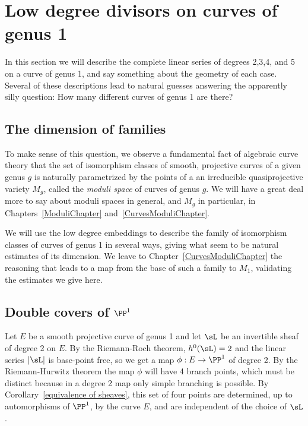 \section{Low degree divisors on curves of genus 1} 

In this section we will describe the complete linear series of degrees 2,3,4, and 5 on a curve of genus 1, and say something
about the geometry of each case. Several of these descriptions lead to natural guesses answering the
apparently silly question: How many different curves of genus 1 are there? 

\subsection {The dimension of families}

To make sense of this question, we observe a fundamental fact of algebraic curve theory that the set of isomorphism classes of smooth, projective curves of a given genus $g$ is naturally parametrized by the points of a
an irreducible quasiprojective variety $M_g$, called the \emph{moduli space} of curves of genus $g$. We will have a great deal more to say about moduli spaces in general, and $M_g$ in particular, in Chapters~\ref{ModuliChapter} and~\ref{CurvesModuliChapter}. 

We will use the low degree embeddings  to describe the family of isomorphism classes of curves of genus 1 in several ways, giving
what seem to be natural estimates of its dimension. We leave to Chapter~\ref{CurvesModuliChapter} the reasoning that leads to a map from the base of such a family to $M_{1}$, validating the estimates we give here.

\subsection{Double covers of $\PP^1$}

Let $E$ be a smooth projective curve of genus 1 and let  $\sL$ be an invertible sheaf of degree 2 on $E$. By the Riemann-Roch theorem, $h^0(\sL) = 2$ and the linear series $|\sL|$ is base-point free, so we get a map $\phi : E \to \PP^1$ of degree 2. By the Riemann-Hurwitz theorem the map $\phi$ will have 4 branch points, which must be distinct because in a degree 2 map
only simple branching is possible. By Corollary~\ref{equivalence of sheaves}, this set of four points are determined, up to automorphisms of $\PP^1$, by the curve $E$, and are independent of the choice of $\sL$. 

